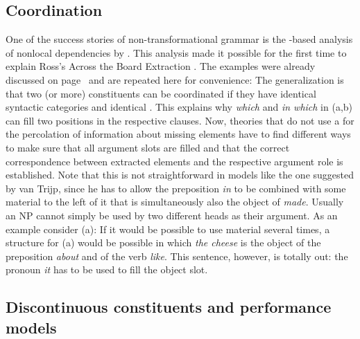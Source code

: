 \subsection{Coordination}
\label{sec-coordination}

One of the success stories of non-transformational grammar is the \slasch-based analysis of nonlocal dependencies
by \citet{Gazdar81}. This analysis made it possible for the first time to explain Ross's Across the Board
Extraction \citep{Ross67}. The examples were already discussed on
page~\pageref{ex-atb-gazdar} and are repeated here for convenience:
\eal\settowidth{}
\label{ex-atb-gazdar-two}
\zl
The generalization is that two (or more) constituents can be coordinated if they have identical
syntactic categories and identical \slashvs. This explains why \emph{which} and \emph{in which} in
(a,b) can fill two positions in the respective clauses. Now, theories that do not use a
\slashf for the percolation of information about missing elements have to find different ways to
make sure that all argument slots are filled and that the correct correspondence between extracted
elements and the respective argument role is established. Note that this is not straightforward in
models like the one suggested by van Trijp, since he has to allow the preposition \emph{in} to be
combined with some material to the left of it that is simultaneously also the object of
\emph{made}. Usually an NP cannot simply be used by two different heads as their argument. As an
example consider (a):
\eal
{}
\zl
If it would be possible to use material several times, a structure for (a) would be possible
in which \emph{the cheese} is the object of the preposition \emph{about} and of the verb
\emph{like}. This sentence, however, is totally out: the pronoun \emph{it} has to be used to fill
the object slot.


\subsection{Discontinuous constituents and performance models}

